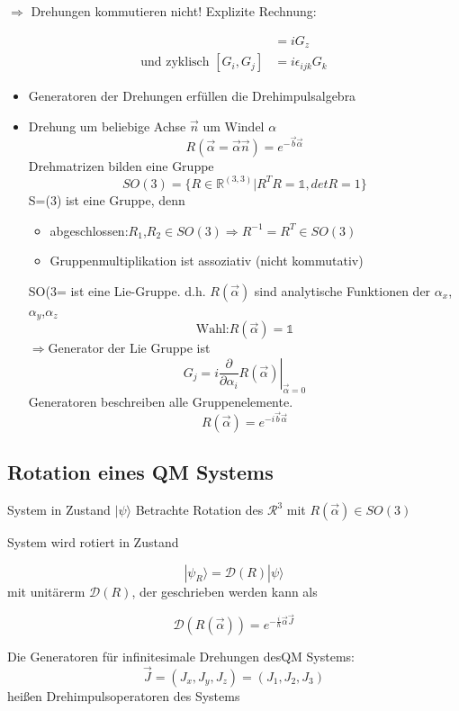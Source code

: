 \(\Rightarrow \) Drehungen kommutieren nicht!
Explizite Rechnung:


\begin{align}
[G_x,G_y] &= iG_z \\
\text{und zyklisch        } [G_i,G_j] &= i\epsilon_{ijk}G_k 
\end{align}


\begin{itemize}
\item Generatoren der Drehungen erfüllen die Drehimpulsalgebra
\item Drehung um beliebige Achse \(\vec n\) um Windel \(\alpha\)
\[ R(\vec \alpha = \vec \alpha \vec n) = e^{- \vec b\vec \alpha}\]
Drehmatrizen bilden eine Gruppe
\[ SO(3) = \{ R\in\mathbb R^{(3,3)} | R^TR=\mathbb 1, det R=1\}\]
S=(3) ist eine Gruppe, denn
\begin{itemize}
\item abgeschlossen:\(R_1\),\(R_2 \in SO(3) \Rightarrow R^{-1}=R^T \in SO(3)\) 
\item Gruppenmultiplikation ist assoziativ (nicht kommutativ)
\end{itemize}

SO(3= ist eine Lie-Gruppe. d.h. \(R(\vec\alpha)\) sind analytische Funktionen der
\(\alpha_x\),\(\alpha_y\),\(\alpha_z\)
\[ \text{Wahl:}R(\vec\alpha)=\mathbb 1 \]
\(\Rightarrow \)Generator der Lie Gruppe ist
\[ G_j=\left. i\frac \partial {\partial \alpha_i}R(\vec\alpha)\right|_{\vec
  \alpha=0} \]
Generatoren beschreiben alle Gruppenelemente.
\[ R(\vec\alpha)= e^{-i\vec b \vec \alpha} \]
\end{itemize}





\subsection{Rotation eines QM Systems}
System in Zustand \(|\psi\rangle\) Betrachte Rotation des \(\mathcal R^3\) mit \(R(\vec \alpha) \in SO(3)\)

System wird rotiert in Zustand

\[
|\psi_R\rangle  = \mathcal D(R)|\psi\rangle 
\]
mit unitärerm \(\mathcal D(R)\), der geschrieben werden kann als 

\[
\mathcal D(R(\vec \alpha))=e^{-\frac i \hbar \vec \alpha \vec J}
\]

Die Generatoren für infinitesimale Drehungen desQM Systems:
\[
\vec J = (J_x,J_y,J_z) = (J_1,J_2,J_3)
\]
heißen Drehimpulsoperatoren des Systems



